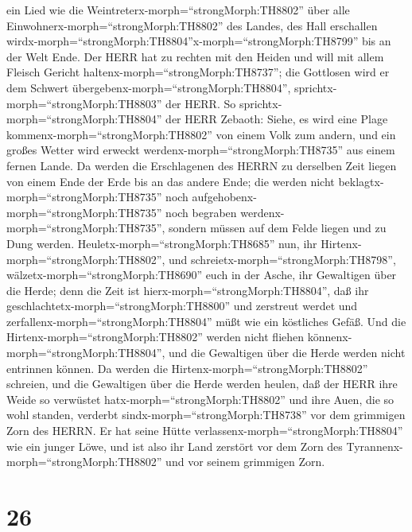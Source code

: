 ein Lied wie die Weintreterx-morph=``strongMorph:TH8802'' über alle
Einwohnerx-morph=``strongMorph:TH8802'' des Landes, des Hall erschallen
wirdx-morph=``strongMorph:TH8804''x-morph=``strongMorph:TH8799'' bis an
der Welt Ende.  Der HERR hat zu rechten mit den Heiden und
will mit allem Fleisch Gericht haltenx-morph=``strongMorph:TH8737''; die
Gottlosen wird er dem Schwert übergebenx-morph=``strongMorph:TH8804'',
sprichtx-morph=``strongMorph:TH8803'' der HERR.  So
sprichtx-morph=``strongMorph:TH8804'' der HERR Zebaoth: Siehe, es wird
eine Plage kommenx-morph=``strongMorph:TH8802'' von einem Volk zum
andern, und ein großes Wetter wird erweckt
werdenx-morph=``strongMorph:TH8735'' aus einem fernen Lande.
 Da werden die Erschlagenen des HERRN zu derselben Zeit
liegen von einem Ende der Erde bis an das andere Ende; die werden nicht
beklagtx-morph=``strongMorph:TH8735'' noch
aufgehobenx-morph=``strongMorph:TH8735'' noch begraben
werdenx-morph=``strongMorph:TH8735'', sondern müssen auf dem Felde
liegen und zu Dung werden. 
Heuletx-morph=``strongMorph:TH8685'' nun, ihr
Hirtenx-morph=``strongMorph:TH8802'', und
schreietx-morph=``strongMorph:TH8798'',
wälzetx-morph=``strongMorph:TH8690'' euch in der Asche, ihr Gewaltigen
über die Herde; denn die Zeit ist hierx-morph=``strongMorph:TH8804'',
daß ihr geschlachtetx-morph=``strongMorph:TH8800'' und zerstreut werdet
und zerfallenx-morph=``strongMorph:TH8804'' müßt wie ein köstliches
Gefäß.  Und die Hirtenx-morph=``strongMorph:TH8802'' werden
nicht fliehen könnenx-morph=``strongMorph:TH8804'', und die Gewaltigen
über die Herde werden nicht entrinnen können.  Da werden
die Hirtenx-morph=``strongMorph:TH8802'' schreien, und die Gewaltigen
über die Herde werden heulen, daß der HERR ihre Weide so verwüstet
hatx-morph=``strongMorph:TH8802''  und ihre Auen, die so
wohl standen, verderbt sindx-morph=``strongMorph:TH8738'' vor dem
grimmigen Zorn des HERRN.  Er hat seine Hütte
verlassenx-morph=``strongMorph:TH8804'' wie ein junger Löwe, und ist
also ihr Land zerstört vor dem Zorn des
Tyrannenx-morph=``strongMorph:TH8802'' und vor seinem grimmigen Zorn.

\hypertarget{section-25}{%
\section{26}\label{section-25}}

